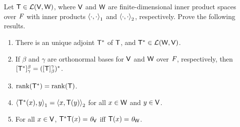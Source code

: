 \begin{ex}\label{ex:6.3.15}
  Let \(\mathsf{T} \in \mathcal{L}(\mathsf{V}, \mathsf{W})\), where \(\mathsf{V}\) and \(\mathsf{W}\) are finite-dimensional inner product spaces over \(\mathit{F}\) with inner products \(\left\langle\cdot, \cdot\right\rangle_1\) and \(\left\langle\cdot, \cdot\right\rangle_2\), respectively.
  Prove the following results.
  \begin{enumerate}
    \item There is an unique adjoint \(\mathsf{T}^*\) of \(\mathsf{T}\), and \(\mathsf{T}^* \in \mathcal{L}(\mathsf{W}, \mathsf{V})\).
    \item If \(\beta\) and \(\gamma\) are orthonormal bases for \(\mathsf{V}\) and \(\mathsf{W}\) over \(\mathit{F}\), respectively, then \([\mathsf{T}^*]_{\gamma}^{\beta} = ([\mathsf{T}]_{\beta}^{\gamma})^*\).
    \item \(\rk{\T^*} = \rk{\T}\).
    \item \(\left\langle\mathsf{T}^*(x), y\right\rangle_1 = \left\langle x, \mathsf{T}(y)\right\rangle_2\) for all \(x \in \mathsf{W}\) and \(y \in \mathsf{V}\).
    \item For all \(x \in \mathsf{V}\), \(\mathsf{T}^* \mathsf{T}(x) = \mathit{0}_{\mathsf{V}}\) iff \(\mathsf{T}(x) = \mathit{0}_{\mathsf{W}}\).
  \end{enumerate}
\end{ex}

